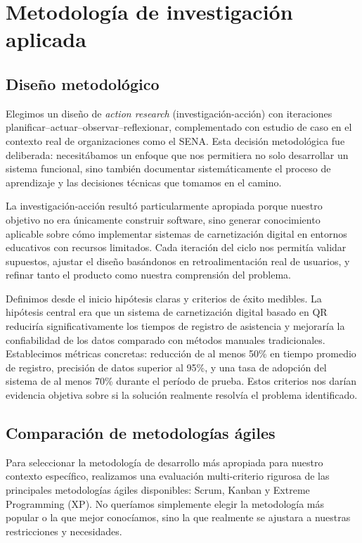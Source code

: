 \section{Metodología de investigación aplicada}

\subsection{Diseño metodológico}

Elegimos un diseño de \textit{action research} (investigación-acción) con iteraciones planificar--actuar--observar--reflexionar, complementado con estudio de caso en el contexto real de organizaciones como el SENA. Esta decisión metodológica fue deliberada: necesitábamos un enfoque que nos permitiera no solo desarrollar un sistema funcional, sino también documentar sistemáticamente el proceso de aprendizaje y las decisiones técnicas que tomamos en el camino.

La investigación-acción resultó particularmente apropiada porque nuestro objetivo no era únicamente construir software, sino generar conocimiento aplicable sobre cómo implementar sistemas de carnetización digital en entornos educativos con recursos limitados. Cada iteración del ciclo nos permitía validar supuestos, ajustar el diseño basándonos en retroalimentación real de usuarios, y refinar tanto el producto como nuestra comprensión del problema.

Definimos desde el inicio hipótesis claras y criterios de éxito medibles. La hipótesis central era que un sistema de carnetización digital basado en QR reduciría significativamente los tiempos de registro de asistencia y mejoraría la confiabilidad de los datos comparado con métodos manuales tradicionales. Establecimos métricas concretas: reducción de al menos 50\% en tiempo promedio de registro, precisión de datos superior al 95\%, y una tasa de adopción del sistema de al menos 70\% durante el período de prueba. Estos criterios nos darían evidencia objetiva sobre si la solución realmente resolvía el problema identificado.

\subsection{Comparación de metodologías ágiles}

Para seleccionar la metodología de desarrollo más apropiada para nuestro contexto específico, realizamos una evaluación multi-criterio rigurosa de las principales metodologías ágiles disponibles: Scrum, Kanban y Extreme Programming (XP). No queríamos simplemente elegir la metodología más popular o la que mejor conocíamos, sino la que realmente se ajustara a nuestras restricciones y necesidades.

